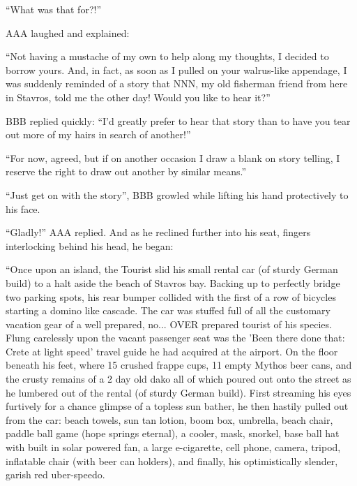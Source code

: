\documentclass[10pt,twoside,openright]{memoir}
\begin{document}
``What was that for?!''

AAA laughed and explained:

``Not having a mustache of my own to help along my thoughts, I decided to borrow yours. And, in fact, as soon as I pulled on your walrus-like appendage, I was suddenly reminded of a story that NNN, my old fisherman friend from here in Stavros, told me the other day! Would you like to hear it?''

BBB replied quickly: ``I'd greatly prefer to hear that story than to have you tear out more of my hairs in search of another!''

``For now, agreed, but if on another occasion I draw a blank on story telling, I reserve the right to draw out another by similar means.''

``Just get on with the story'', BBB growled while lifting his hand protectively to his face.

``Gladly!'' AAA replied. And as he reclined further into his seat, fingers interlocking behind his head, he began:

``Once upon an island, the Tourist slid his small rental car (of sturdy German build) to a halt aside the beach of Stavros bay. Backing up to perfectly bridge two parking spots, his rear bumper collided with the first of a row of bicycles starting a domino like cascade. The car was stuffed full of all the customary vacation gear of a well prepared, no... OVER prepared tourist of his species. Flung carelessly upon the vacant passenger seat was the 'Been there done that: Crete at light speed' travel guide he had acquired at the airport. On the floor beneath his feet, where 15 crushed frappe cups, 11 empty Mythos beer cans, and the crusty remains of a 2 day old dako all of which poured out onto the street as he lumbered out of the rental (of sturdy German build). First streaming his eyes furtively for a chance glimpse of a topless sun bather, he then hastily pulled out from the car: beach towels, sun tan lotion, boom box, umbrella, beach chair, paddle ball game (hope springs eternal), a cooler, mask, snorkel, base ball hat with built in solar powered fan, a large e-cigarette, cell phone, camera, tripod, inflatable chair (with beer can holders), and finally, his optimistically slender, garish red uber-speedo.
\end{document}

